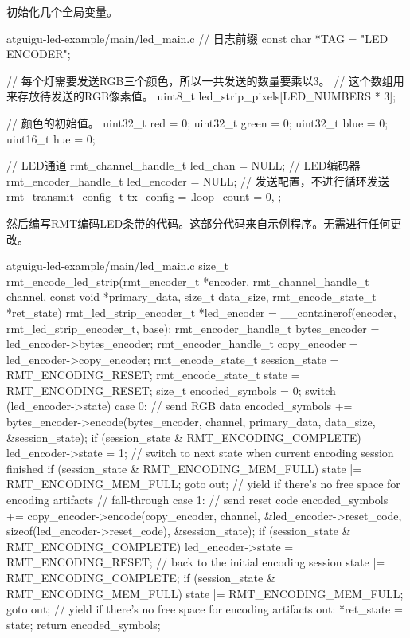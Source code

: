 \documentclass[lang=cn,newtx,10pt,scheme=chinese]{elegantbook}
\begin{document}
初始化几个全局变量。

\begin{mycode}{atguigu-led-example/main/led\_main.c}
// 日志前缀
const char *TAG = "LED ENCODER";

// 每个灯需要发送RGB三个颜色，所以一共发送的数量要乘以3。
// 这个数组用来存放待发送的RGB像素值。
uint8_t led_strip_pixels[LED_NUMBERS * 3];

// 颜色的初始值。
uint32_t red = 0;
uint32_t green = 0;
uint32_t blue = 0;
uint16_t hue = 0;

// LED通道
rmt_channel_handle_t led_chan = NULL;
// LED编码器
rmt_encoder_handle_t led_encoder = NULL;
// 发送配置，不进行循环发送
rmt_transmit_config_t tx_config = {
    .loop_count = 0,
};
\end{mycode}

然后编写RMT编码LED条带的代码。这部分代码来自示例程序。无需进行任何更改。

\begin{mycode}{atguigu-led-example/main/led\_main.c}
size_t rmt_encode_led_strip(rmt_encoder_t *encoder, rmt_channel_handle_t channel, const void *primary_data, size_t data_size, rmt_encode_state_t *ret_state)
{
    rmt_led_strip_encoder_t *led_encoder = __containerof(encoder, rmt_led_strip_encoder_t, base);
    rmt_encoder_handle_t bytes_encoder = led_encoder->bytes_encoder;
    rmt_encoder_handle_t copy_encoder = led_encoder->copy_encoder;
    rmt_encode_state_t session_state = RMT_ENCODING_RESET;
    rmt_encode_state_t state = RMT_ENCODING_RESET;
    size_t encoded_symbols = 0;
    switch (led_encoder->state)
    {
    case 0: // send RGB data
        encoded_symbols += bytes_encoder->encode(bytes_encoder, channel, primary_data, data_size, &session_state);
        if (session_state & RMT_ENCODING_COMPLETE)
        {
            led_encoder->state = 1; // switch to next state when current encoding session finished
        }
        if (session_state & RMT_ENCODING_MEM_FULL)
        {
            state |= RMT_ENCODING_MEM_FULL;
            goto out; // yield if there's no free space for encoding artifacts
        }
    // fall-through
    case 1: // send reset code
        encoded_symbols += copy_encoder->encode(copy_encoder, channel, &led_encoder->reset_code,
                                                sizeof(led_encoder->reset_code), &session_state);
        if (session_state & RMT_ENCODING_COMPLETE)
        {
            led_encoder->state = RMT_ENCODING_RESET; // back to the initial encoding session
            state |= RMT_ENCODING_COMPLETE;
        }
        if (session_state & RMT_ENCODING_MEM_FULL)
        {
            state |= RMT_ENCODING_MEM_FULL;
            goto out; // yield if there's no free space for encoding artifacts
        }
    }
out:
    *ret_state = state;
    return encoded_symbols;
}
\end{mycode}
\end{document}
